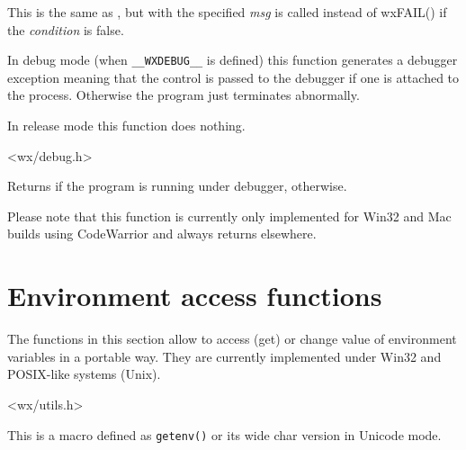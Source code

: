 \label{wxcheck2msg}


This is the same as , but
 with the specified {\it msg} is called
instead of wxFAIL() if the {\it condition} is false.


\label{wxtrap}


In debug mode (when {\tt \_\_WXDEBUG\_\_} is defined) this function generates a
debugger exception meaning that the control is passed to the debugger if one is
attached to the process. Otherwise the program just terminates abnormally.

In release mode this function does nothing.


<wx/debug.h>



\label{wxisdebuggerrunning}


Returns \true if the program is running under debugger, \false otherwise.

Please note that this function is currently only implemented for Win32 and Mac
builds using CodeWarrior and always returns \false elsewhere.




\section{Environment access functions}\label{environfunctions}

The functions in this section allow to access (get) or change value of
environment variables in a portable way. They are currently implemented under
Win32 and POSIX-like systems (Unix).



<wx/utils.h>


\label{wxgetenvmacro}


This is a macro defined as {\tt getenv()} or its wide char version in Unicode
mode.

